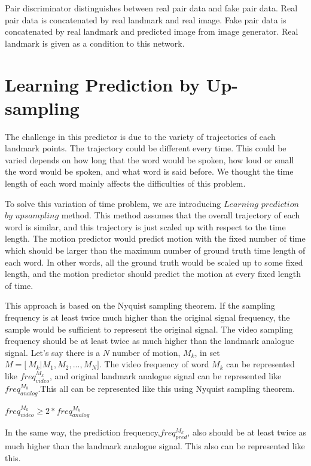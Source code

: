 \documentclass[10pt,twocolumn,letterpaper]{article}
\begin{document}
Pair discriminator distinguishes between real pair data and fake pair data. Real pair data is concatenated by real landmark and real image. Fake pair data is concatenated by real landmark and predicted image from image generator. Real landmark is given as a condition to this network.

\section{Learning Prediction by Up-sampling}
The challenge in this predictor is due to the variety of trajectories of each landmark points. The trajectory could be different every time. This could be varied depends on how long that the word would be spoken, how loud or small the word would be spoken, and what word is said before. We thought the time length of each word mainly affects the difficulties of this problem.

To solve this variation of time problem, we are introducing $Learning$ $ prediction$ $by$ $upsampling$ method. This method assumes that the overall trajectory of each word is similar, and this trajectory is just scaled up with respect to the time length. The motion predictor would predict motion with the fixed number of time which should be larger than the maximum number of ground truth time length of each word. In other words, all the ground truth would be scaled up to some fixed length, and the motion predictor should predict the motion at every fixed length of time.

This approach is based on the Nyquist sampling theorem. If the sampling frequency is at least twice much higher than the original signal frequency, the sample would be sufficient to represent the original signal. The video sampling frequency should be at least twice as much higher than the landmark analogue signal. Let's say there is a $N$ number of motion, $M_k$, in set $M = \big[\ M_k|M_1,M_2, ... , M_N\big]$. The video frequency of word $M_k$ can be represented like  $freq_{video}^{M_k}$, and original landmark analogue signal can be represented like $freq_{analog}^{M_k}$.This all can be represented like this using Nyquist sampling theorem.

\bigskip
\begin{center}
$freq_{video}^{M_k} \geq 2 \ast freq_{analog}^{M_k} $
\end{center}
\bigskip

In the same way, the prediction frequency,$freq_{pred}^{M_k}$, also should be at least twice as much higher than the landmark analogue signal. This also can be represented like this.
\end{document}
